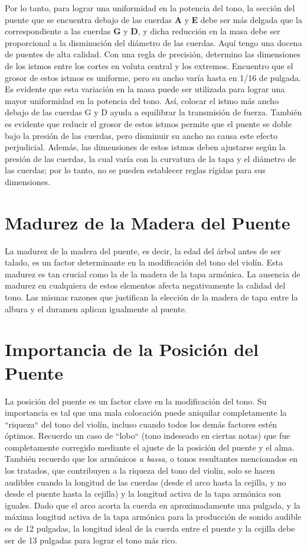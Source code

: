 \documentclass[12pt]{book}
\begin{document}
Por lo tanto, para lograr una uniformidad en la potencia del tono, la sección del puente que se encuentra debajo de las cuerdas \textbf{A} y \textbf{E} debe ser más delgada que la correspondiente a las cuerdas \textbf{G} y \textbf{D}, y dicha reducción en la masa debe ser proporcional a la disminución del diámetro de las cuerdas.
Aquí tengo una docena de puentes de alta calidad. Con una regla de precisión, determino las dimensiones de los istmos entre los cortes en voluta central y los extremos. Encuentro que el grosor de estos istmos es uniforme, pero su ancho varía hasta en 1/16 de pulgada. Es evidente que esta variación en la masa puede ser utilizada para lograr una mayor uniformidad en la potencia del tono. Así, colocar el istmo más ancho debajo de las cuerdas G y D ayuda a equilibrar la transmisión de fuerza. También es evidente que reducir el grosor de estos istmos permite que el puente se doble bajo la presión de las cuerdas, pero disminuir su ancho no causa este efecto perjudicial. Además, las dimensiones de estos istmos deben ajustarse según la presión de las cuerdas, la cual varía con la curvatura de la tapa y el diámetro de las cuerdas; por lo tanto, no se pueden establecer reglas rígidas para sus dimensiones.

\section*{Madurez de la Madera del Puente}

La madurez de la madera del puente, es decir, la edad del árbol antes de ser talado, es un factor determinante en la modificación del tono del violín. Esta madurez es tan crucial como la de la madera de la tapa armónica. La ausencia de madurez en cualquiera de estos elementos afecta negativamente la calidad del tono. Las mismas razones que justifican la elección de la madera de tapa entre la albura y el duramen aplican igualmente al puente.

\section*{Importancia de la Posición del Puente}

La posición del puente es un factor clave en la modificación del tono. Su importancia es tal que una mala colocación puede aniquilar completamente la ``riqueza`` del tono del violín, incluso cuando todos los demás factores estén óptimos. Recuerdo un caso de ``lobo`` (tono indeseado en ciertas notas) que fue completamente corregido mediante el ajuste de la posición del puente y el alma. También recuerdo que los armónicos \textit{a bassa}, o tonos resultantes mencionados en los tratados, que contribuyen a la riqueza del tono del violín, solo se hacen audibles cuando la longitud de las cuerdas (desde el arco hasta la cejilla, y no desde el puente hasta la cejilla) y la longitud activa de la tapa armónica son iguales. Dado que el arco acorta la cuerda en aproximadamente una pulgada, y la máxima longitud activa de la tapa armónica para la producción de sonido audible es de 12 pulgadas, la longitud ideal de la cuerda entre el puente y la cejilla debe ser de 13 pulgadas para lograr el tono más rico.
\end{document}
